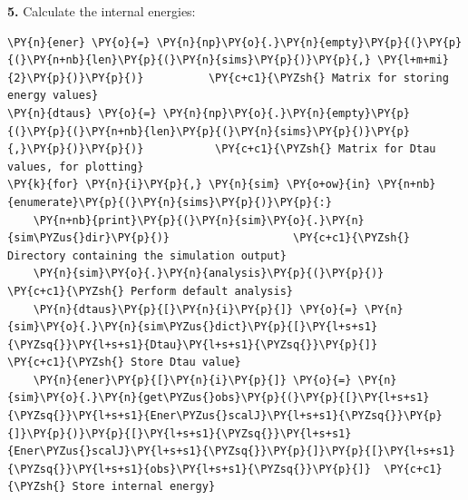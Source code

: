     \textbf{5.} Calculate the internal energies:

    \begin{tcolorbox}[breakable, size=fbox, boxrule=1pt, pad at break*=1mm,colback=cellbackground, colframe=cellborder]
\begin{Verbatim}[commandchars=\\\{\}]
\PY{n}{ener} \PY{o}{=} \PY{n}{np}\PY{o}{.}\PY{n}{empty}\PY{p}{(}\PY{p}{(}\PY{n+nb}{len}\PY{p}{(}\PY{n}{sims}\PY{p}{)}\PY{p}{,} \PY{l+m+mi}{2}\PY{p}{)}\PY{p}{)}          \PY{c+c1}{\PYZsh{} Matrix for storing energy values}
\PY{n}{dtaus} \PY{o}{=} \PY{n}{np}\PY{o}{.}\PY{n}{empty}\PY{p}{(}\PY{p}{(}\PY{n+nb}{len}\PY{p}{(}\PY{n}{sims}\PY{p}{)}\PY{p}{,}\PY{p}{)}\PY{p}{)}           \PY{c+c1}{\PYZsh{} Matrix for Dtau values, for plotting}
\PY{k}{for} \PY{n}{i}\PY{p}{,} \PY{n}{sim} \PY{o+ow}{in} \PY{n+nb}{enumerate}\PY{p}{(}\PY{n}{sims}\PY{p}{)}\PY{p}{:}
    \PY{n+nb}{print}\PY{p}{(}\PY{n}{sim}\PY{o}{.}\PY{n}{sim\PYZus{}dir}\PY{p}{)}                   \PY{c+c1}{\PYZsh{} Directory containing the simulation output}
    \PY{n}{sim}\PY{o}{.}\PY{n}{analysis}\PY{p}{(}\PY{p}{)}                       \PY{c+c1}{\PYZsh{} Perform default analysis}
    \PY{n}{dtaus}\PY{p}{[}\PY{n}{i}\PY{p}{]} \PY{o}{=} \PY{n}{sim}\PY{o}{.}\PY{n}{sim\PYZus{}dict}\PY{p}{[}\PY{l+s+s1}{\PYZsq{}}\PY{l+s+s1}{Dtau}\PY{l+s+s1}{\PYZsq{}}\PY{p}{]}                             \PY{c+c1}{\PYZsh{} Store Dtau value}
    \PY{n}{ener}\PY{p}{[}\PY{n}{i}\PY{p}{]} \PY{o}{=} \PY{n}{sim}\PY{o}{.}\PY{n}{get\PYZus{}obs}\PY{p}{(}\PY{p}{[}\PY{l+s+s1}{\PYZsq{}}\PY{l+s+s1}{Ener\PYZus{}scalJ}\PY{l+s+s1}{\PYZsq{}}\PY{p}{]}\PY{p}{)}\PY{p}{[}\PY{l+s+s1}{\PYZsq{}}\PY{l+s+s1}{Ener\PYZus{}scalJ}\PY{l+s+s1}{\PYZsq{}}\PY{p}{]}\PY{p}{[}\PY{l+s+s1}{\PYZsq{}}\PY{l+s+s1}{obs}\PY{l+s+s1}{\PYZsq{}}\PY{p}{]}  \PY{c+c1}{\PYZsh{} Store internal energy}
\end{Verbatim}
\end{tcolorbox}

